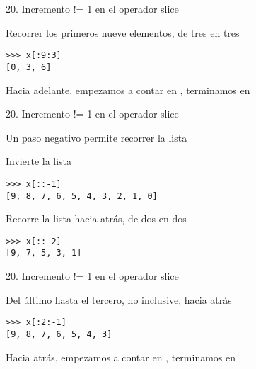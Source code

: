 \begin{frame}[fragile]
  {20. \large Incremento != 1 en el operador slice}
  \begin{exampleblock}
    {Recorrer los primeros nueve elementos, de tres en tres}
    \begin{lstlisting}
>>> x[:9:3]
[0, 3, 6]
    \end{lstlisting}
  \end{exampleblock}

  \begin{alertblock}{}
    \small
    \centering
    Hacia adelante, empezamos a contar en , terminamos
    en 
  \end{alertblock}
\end{frame}

\begin{frame}[fragile]
  {20. \large Incremento != 1 en el operador slice}
  \begin{block}{}
    \centering
    Un paso negativo permite recorrer la lista 
  \end{block}

  \small
  \begin{exampleblock}
    {Invierte la lista}
    \begin{lstlisting}
>>> x[::-1]
[9, 8, 7, 6, 5, 4, 3, 2, 1, 0]
    \end{lstlisting}
  \end{exampleblock}

  \begin{exampleblock}
    {Recorre la lista hacia atrás, de dos en dos}
    \begin{lstlisting}
>>> x[::-2]
[9, 7, 5, 3, 1]
    \end{lstlisting}
  \end{exampleblock}
\end{frame}

\begin{frame}[fragile]
  {20. \large Incremento != 1 en el operador slice}
  \begin{exampleblock}
    {Del último hasta el tercero, no inclusive, hacia atrás}
    \begin{lstlisting}
>>> x[:2:-1]
[9, 8, 7, 6, 5, 4, 3]
    \end{lstlisting}
  \end{exampleblock}

  \begin{alertblock}{}
    \small
    \centering
    Hacia atrás, empezamos a contar en , terminamos
    en 
  \end{alertblock}
\end{frame}

